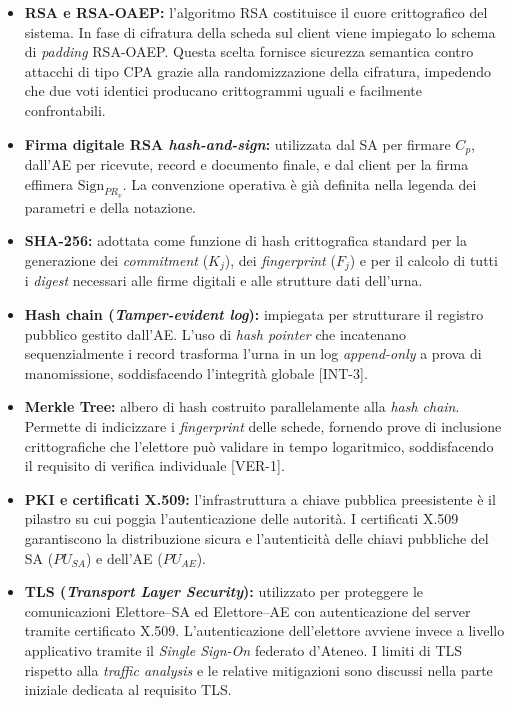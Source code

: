 \begin{itemize}
    \item \textbf{RSA e RSA-OAEP:} l'algoritmo RSA costituisce il cuore crittografico del sistema. In fase di cifratura della scheda sul client viene impiegato lo schema di \textit{padding} RSA-OAEP. Questa scelta fornisce sicurezza semantica contro attacchi di tipo CPA grazie alla randomizzazione della cifratura, impedendo che due voti identici producano crittogrammi uguali e facilmente confrontabili.
    \item \textbf{Firma digitale RSA \textit{hash-and-sign}:} utilizzata dal SA per firmare $C_p$, dall'AE per ricevute, record e documento finale, e dal client per la firma effimera $\text{Sign}_{PR_v}$. La convenzione operativa è già definita nella legenda dei parametri e della notazione.
    \item \textbf{SHA-256:} adottata come funzione di hash crittografica standard per la generazione dei \textit{commitment} ($K_j$), dei \textit{fingerprint} ($F_j$) e per il calcolo di tutti i \textit{digest} necessari alle firme digitali e alle strutture dati dell'urna.
    \item \textbf{Hash chain (\textit{Tamper-evident log}):} impiegata per strutturare il registro pubblico gestito dall'AE. L'uso di \textit{hash pointer} che incatenano sequenzialmente i record trasforma l'urna in un log \textit{append-only} a prova di manomissione, soddisfacendo l'integrità globale [INT-3].
    \item \textbf{Merkle Tree:} albero di hash costruito parallelamente alla \textit{hash chain}. Permette di indicizzare i \textit{fingerprint} delle schede, fornendo prove di inclusione crittografiche che l'elettore può validare in tempo logaritmico, soddisfacendo il requisito di verifica individuale [VER-1].
    \item \textbf{PKI e certificati X.509:} l'infrastruttura a chiave pubblica preesistente è il pilastro su cui poggia l'autenticazione delle autorità. I certificati X.509 garantiscono la distribuzione sicura e l'autenticità delle chiavi pubbliche del SA ($PU_{SA}$) e dell'AE ($PU_{AE}$).
    \item \textbf{TLS (\textit{Transport Layer Security}):} utilizzato per proteggere le comunicazioni Elettore--SA ed Elettore--AE con autenticazione del server tramite certificato X.509. L'autenticazione dell'elettore avviene invece a livello applicativo tramite il \textit{Single Sign-On} federato d'Ateneo. I limiti di TLS rispetto alla \textit{traffic analysis} e le relative mitigazioni sono discussi nella parte iniziale dedicata al requisito TLS.

\end{itemize}
